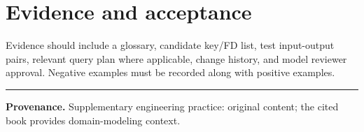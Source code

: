 \documentclass[11pt,letterpaper]{article}
\begin{document}
\section{Evidence and acceptance}
Evidence should include a glossary, candidate key/FD list, test input-output pairs, relevant query plan where applicable, change history, and model reviewer approval. Negative examples must be recorded along with positive examples.


\vfill
\hrule
{\footnotesize\textbf{Provenance.} Supplementary engineering practice: original content; the cited book provides domain-modeling context.}
\end{document}
